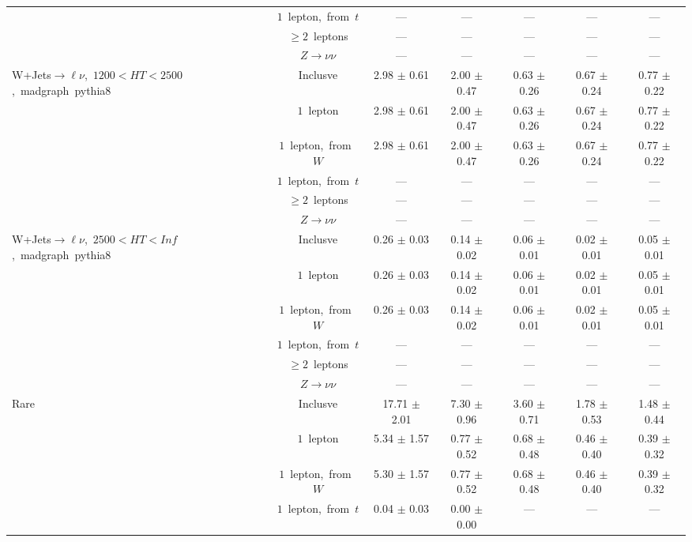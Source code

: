 \documentclass{article}
\begin{document}
\begin{longtable}{|l|c|c|c|c|c|c|}
 & $1$~lepton,~from~$t$  & ---  & ---  & ---  & ---  & --- \\* 
 & $\ge2$~leptons  & ---  & ---  & ---  & ---  & --- \\* 
 & $Z\rightarrow\nu\nu$  & ---  & ---  & ---  & ---  & --- \\* 
\hline 
\multirow{6}{*}{W+Jets$\rightarrow\ell\nu$,~$1200<HT<2500$,~madgraph~pythia8} & Inclusve  & 2.98 $\pm$ 0.61  & 2.00 $\pm$ 0.47  & 0.63 $\pm$ 0.26  & 0.67 $\pm$ 0.24  & 0.77 $\pm$ 0.22 \\* 
 & $1$~lepton  & 2.98 $\pm$ 0.61  & 2.00 $\pm$ 0.47  & 0.63 $\pm$ 0.26  & 0.67 $\pm$ 0.24  & 0.77 $\pm$ 0.22 \\* 
 & $1$~lepton,~from~$W$  & 2.98 $\pm$ 0.61  & 2.00 $\pm$ 0.47  & 0.63 $\pm$ 0.26  & 0.67 $\pm$ 0.24  & 0.77 $\pm$ 0.22 \\* 
 & $1$~lepton,~from~$t$  & ---  & ---  & ---  & ---  & --- \\* 
 & $\ge2$~leptons  & ---  & ---  & ---  & ---  & --- \\* 
 & $Z\rightarrow\nu\nu$  & ---  & ---  & ---  & ---  & --- \\* 
\hline 
\multirow{6}{*}{W+Jets$\rightarrow\ell\nu$,~$2500<HT<Inf$,~madgraph~pythia8} & Inclusve  & 0.26 $\pm$ 0.03  & 0.14 $\pm$ 0.02  & 0.06 $\pm$ 0.01  & 0.02 $\pm$ 0.01  & 0.05 $\pm$ 0.01 \\* 
 & $1$~lepton  & 0.26 $\pm$ 0.03  & 0.14 $\pm$ 0.02  & 0.06 $\pm$ 0.01  & 0.02 $\pm$ 0.01  & 0.05 $\pm$ 0.01 \\* 
 & $1$~lepton,~from~$W$  & 0.26 $\pm$ 0.03  & 0.14 $\pm$ 0.02  & 0.06 $\pm$ 0.01  & 0.02 $\pm$ 0.01  & 0.05 $\pm$ 0.01 \\* 
 & $1$~lepton,~from~$t$  & ---  & ---  & ---  & ---  & --- \\* 
 & $\ge2$~leptons  & ---  & ---  & ---  & ---  & --- \\* 
 & $Z\rightarrow\nu\nu$  & ---  & ---  & ---  & ---  & --- \\* 
\hline 
\multirow{6}{*}{Rare} & Inclusve  & 17.71 $\pm$ 2.01  & 7.30 $\pm$ 0.96  & 3.60 $\pm$ 0.71  & 1.78 $\pm$ 0.53  & 1.48 $\pm$ 0.44 \\* 
 & $1$~lepton  & 5.34 $\pm$ 1.57  & 0.77 $\pm$ 0.52  & 0.68 $\pm$ 0.48  & 0.46 $\pm$ 0.40  & 0.39 $\pm$ 0.32 \\* 
 & $1$~lepton,~from~$W$  & 5.30 $\pm$ 1.57  & 0.77 $\pm$ 0.52  & 0.68 $\pm$ 0.48  & 0.46 $\pm$ 0.40  & 0.39 $\pm$ 0.32 \\* 
 & $1$~lepton,~from~$t$  & 0.04 $\pm$ 0.03  & 0.00 $\pm$ 0.00  & ---  & ---  & --- \\* 

\end{longtable}
\end{document}
